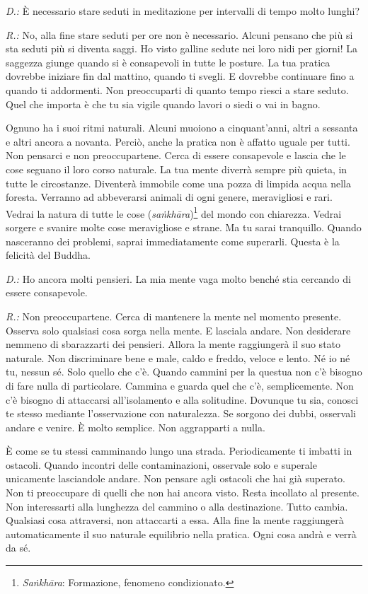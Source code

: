 \emph{D.:} È necessario stare seduti in meditazione per intervalli di tempo
molto lunghi?

\emph{R.:} No, alla fine stare seduti per ore non è necessario. Alcuni pensano
che più si sta seduti più si diventa saggi. Ho visto galline sedute nei
loro nidi per giorni! La saggezza giunge quando si è consapevoli in
tutte le posture. La tua pratica dovrebbe iniziare fin dal mattino,
quando ti svegli. E dovrebbe continuare fino a quando ti addormenti. Non
preoccuparti di quanto tempo riesci a stare seduto. Quel che importa è
che tu sia vigile quando lavori o siedi o vai in bagno.

Ognuno ha i suoi ritmi naturali. Alcuni muoiono a cinquant'anni, altri a
sessanta e altri ancora a novanta. Perciò, anche la pratica non è
affatto uguale per tutti. Non pensarci e non preoccupartene. Cerca di
essere consapevole e lascia che le cose seguano il loro corso naturale.
La tua mente diverrà sempre più quieta, in tutte le circostanze.
Diventerà immobile come una pozza di limpida acqua nella foresta.
Verranno ad abbeverarsi animali di ogni genere, meravigliosi e rari.
Vedrai la natura di tutte le cose (\emph{saṅkhāra})\footnote{\emph{Saṅkhāra}:
  Formazione, fenomeno condizionato.} del mondo con chiarezza. Vedrai
sorgere e svanire molte cose meravigliose e strane. Ma tu sarai
tranquillo. Quando nasceranno dei problemi, saprai immediatamente come
superarli. Questa è la felicità del Buddha.

\emph{D.:} Ho ancora molti pensieri. La mia mente vaga molto benché stia
cercando di essere consapevole.

\emph{R.:} Non preoccupartene. Cerca di mantenere la mente nel momento
presente. Osserva solo qualsiasi cosa sorga nella mente. E lasciala
andare. Non desiderare nemmeno di sbarazzarti dei pensieri. Allora la
mente raggiungerà il suo stato naturale. Non discriminare bene e male,
caldo e freddo, veloce e lento. Né io né tu, nessun sé. Solo quello che
c'è. Quando cammini per la questua non c'è bisogno di fare nulla di
particolare. Cammina e guarda quel che c'è, semplicemente. Non c'è
bisogno di attaccarsi all'isolamento e alla solitudine. Dovunque tu sia,
conosci te stesso mediante l'osservazione con naturalezza. Se sorgono
dei dubbi, osservali andare e venire. È molto semplice. Non aggrapparti
a nulla.

È come se tu stessi camminando lungo una strada. Periodicamente ti
imbatti in ostacoli. Quando incontri delle contaminazioni, osservale
solo e superale unicamente lasciandole andare. Non pensare agli ostacoli
che hai già superato. Non ti preoccupare di quelli che non hai ancora
visto. Resta incollato al presente. Non interessarti alla lunghezza del
cammino o alla destinazione. Tutto cambia. Qualsiasi cosa attraversi,
non attaccarti a essa. Alla fine la mente raggiungerà automaticamente il
suo naturale equilibrio nella pratica. Ogni cosa andrà e verrà da sé.

